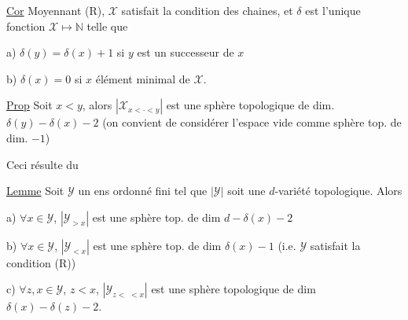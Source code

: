 \uline{Cor} Moyennant (R), $\mathcal X$ satisfait la condition
des chaines, et $\delta$ est l'unique fonction
$\mathcal X\mapsto\mathbb N$ telle que

a) $\delta(y)=\delta(x)+1$ si $y$ est un successeur de $x$

b) $\delta(x)=0$ si $x$ élément minimal de $\mathcal X$.

\uline{Prop}  Soit $x<y$, alors $|\mathcal X_{x<\cdot<y}|$ est une
sphère topologique de dim. $\delta(y)-\delta(x)-2$
(on convient de considérer l'espace vide comme
sphère top. de dim. $-1$)

Ceci résulte du

\uline{Lemme} Soit $\mathcal Y$ un ens ordonné fini tel que
$|\mathcal Y|$ soit une $d$-variété topologique. Alors

a) $\forall x\in\mathcal Y$, $|\mathcal Y_{>x}|$ est une sphère top. de
dim $d-\delta(x)-2$

b) $\forall x\in\mathcal Y$, $|\mathcal Y_{<x}|$ est une sphère top.
de dim $\delta(x)-1$ (i.e. $\mathcal Y$ satisfait la
condition (R))

c) $\forall z,x\in\mathcal Y$, $z<x$, $|\mathcal Y_{z<\,\,<x}|$
 est une sphère topologique de dim
$\delta(x)-\delta(z)-2$.
